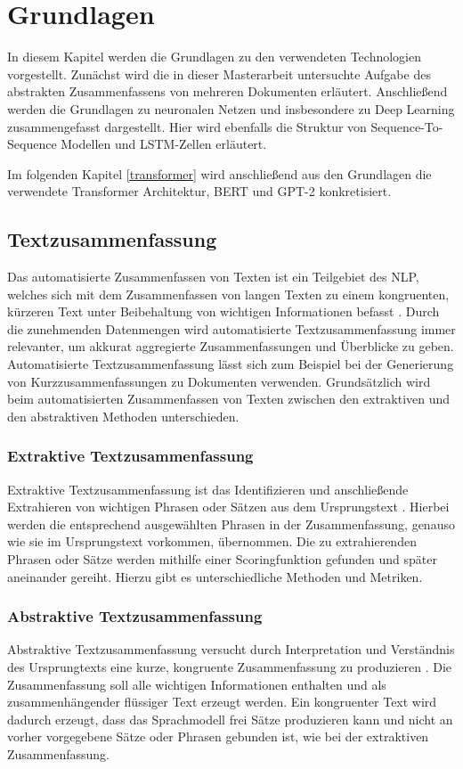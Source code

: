\section{Grundlagen}\raggedbottom
\label{grundlagen}
In diesem Kapitel werden die Grundlagen zu den verwendeten Technologien vorgestellt. 
Zunächst wird die in dieser Masterarbeit untersuchte Aufgabe des abstrakten Zusammenfassens von mehreren Dokumenten erläutert.
Anschließend werden die Grundlagen zu neuronalen Netzen und insbesondere zu Deep Learning zusammengefasst dargestellt. 
Hier wird ebenfalls die Struktur von Sequence-To-Sequence Modellen und LSTM-Zellen erläutert.

Im folgenden Kapitel \ref*{transformer} wird anschließend aus den Grundlagen die verwendete Transformer Architektur, BERT und GPT-2 konkretisiert.


\subsection{Textzusammenfassung}
Das automatisierte Zusammenfassen von Texten ist ein Teilgebiet des NLP, welches sich mit dem Zusammenfassen von langen Texten zu einem kongruenten, kürzeren Text unter Beibehaltung von wichtigen Informationen befasst \citep{DBLP:journals/corr/abs-1904-00688}. 
Durch die zunehmenden Datenmengen wird automatisierte Textzusammenfassung immer relevanter, um akkurat aggregierte Zusammenfassungen und Überblicke zu geben.
Automatisierte Textzusammenfassung lässt sich zum Beispiel bei der Generierung von Kurzzusammenfassungen zu Dokumenten verwenden.
Grundsätzlich wird beim automatisierten Zusammenfassen von Texten zwischen den extraktiven und den abstraktiven Methoden unterschieden.

\subsubsection{Extraktive Textzusammenfassung}
Extraktive Textzusammenfassung ist das Identifizieren und anschließende Extrahieren von wichtigen Phrasen oder Sätzen aus dem Ursprungstext \citep{DBLP:journals/corr/ChengL16a}.
Hierbei werden die entsprechend ausgewählten Phrasen in der Zusammenfassung, genauso wie sie im Ursprungstext vorkommen, übernommen.
Die zu extrahierenden Phrasen oder Sätze werden mithilfe einer Scoringfunktion gefunden und später aneinander gereiht. Hierzu gibt es unterschiedliche Methoden und Metriken.

\subsubsection{Abstraktive Textzusammenfassung}
Abstraktive Textzusammenfassung versucht durch Interpretation und Verständnis des Ursprungtexts eine kurze, kongruente Zusammenfassung zu produzieren \citep{DBLP:journals/corr/NallapatiXZ16}. 
Die Zusammenfassung soll alle wichtigen Informationen enthalten und als zusammenhängender flüssiger Text erzeugt werden. 
Ein kongruenter Text wird dadurch erzeugt, dass das Sprachmodell frei Sätze produzieren kann und nicht an vorher vorgegebene Sätze oder Phrasen gebunden ist, wie bei der extraktiven Zusammenfassung.

